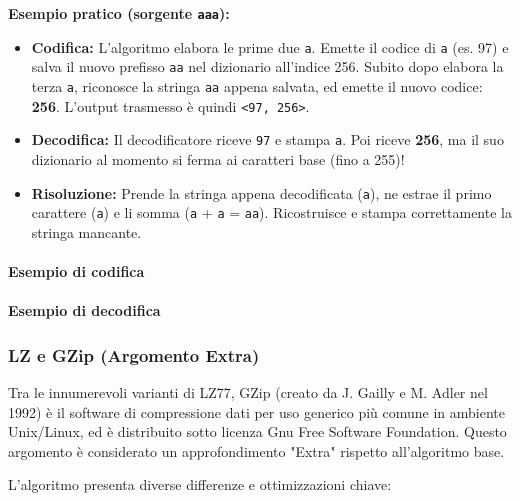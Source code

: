 \noindent\textbf{Esempio pratico (sorgente \texttt{aaa}):}
\begin{itemize}
    \item \textbf{Codifica:} L'algoritmo elabora le prime due \texttt{a}. Emette il codice di \texttt{a} (es. 97) e salva il nuovo prefisso \texttt{aa} nel dizionario all'indice 256. Subito dopo elabora la terza \texttt{a}, riconosce la stringa \texttt{aa} appena salvata, ed emette il nuovo codice: \textbf{256}. L'output trasmesso è quindi \texttt{<97, 256>}.
    \item \textbf{Decodifica:} Il decodificatore riceve \texttt{97} e stampa \texttt{a}. Poi riceve \textbf{256}, ma il suo dizionario al momento si ferma ai caratteri base (fino a 255)!
    \item \textbf{Risoluzione:} Prende la stringa appena decodificata (\texttt{a}), ne estrae il primo carattere (\texttt{a}) e li somma (\texttt{a} + \texttt{a} = \texttt{aa}). Ricostruisce e stampa correttamente la stringa mancante.
\end{itemize}




\paragraph{Esempio di codifica}


\paragraph{Esempio di decodifica}

\noindent





\subsubsection{LZ e GZip (Argomento Extra)}
Tra le innumerevoli varianti di LZ77, GZip (creato da J. Gailly e M. Adler nel 1992) è il software di compressione dati per uso generico più comune in ambiente Unix/Linux, ed è distribuito sotto licenza Gnu Free Software Foundation. Questo argomento è considerato un approfondimento "Extra" rispetto all'algoritmo base.

L'algoritmo presenta diverse differenze e ottimizzazioni chiave:

